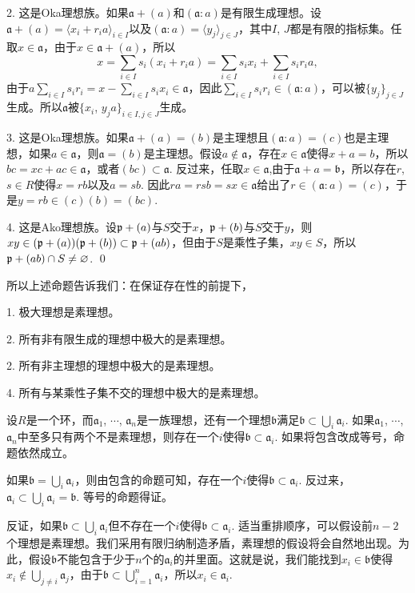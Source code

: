 	2. 这是Oka理想族。如果$\mathfrak{a}+(a)$和$(\mathfrak{a}:a)$是有限生成理想。设$\mathfrak{a}+(a)=\langle x_i+r_ia \rangle_{i\in I}$以及$(\mathfrak{a}:a)=\langle y_j\rangle_{j\in J}$，其中$I$, $J$都是有限的指标集。任取$x\in \mathfrak{a}$，由于$x\in \mathfrak{a}+(a)$，所以
	\[
		x= \sum_{i\in I}s_i(x_i+r_ia)=\sum_{i\in I}s_ix_i+\sum_{i\in I}s_ir_ia,
	\]
	由于$a\sum_{i\in I}s_ir_i=x-\sum_{i\in I}s_ix_i\in \mathfrak{a}$，因此$\sum_{i\in I}s_ir_i\in (\mathfrak{a}:a)$，可以被$\{y_j\}_{j\in J}$生成。所以$\mathfrak{a}$被$\{x_i$, $y_ja\}_{i\in I,j\in J}$生成。

	3. 这是Oka理想族。如果$\mathfrak{a}+(a)=(b)$是主理想且$(\mathfrak{a}:a)=(c)$也是主理想，如果$a\in \mathfrak{a}$，则$\mathfrak{a}=(b)$是主理想。假设$a\not\in\mathfrak{a}$，存在$x\in \mathfrak{a}$使得$x+a=b$，所以$bc=xc+ac\in \mathfrak{a}$，或者$(bc)\subset \mathfrak{a}$. 反过来，任取$x\in \mathfrak{a}$,由于$\mathfrak{a}+a=\mathfrak{b}$，所以存在$r$, $s\in R$使得$x=rb$以及$a=sb$. 因此$ra=rsb=sx\in\mathfrak{a}$给出了$r\in (\mathfrak{a}:a)=(c)$，于是$y=rb\in (c)(b)=(bc)$.

	4. 这是Ako理想族。设$\mathfrak{p}+(a)$与$S$交于$x$，$\mathfrak{p}+(b)$与$S$交于$y$，则$xy\in (\mathfrak{p}+(a))(\mathfrak{p}+(b))\subset \mathfrak{p}+(ab)$，但由于$S$是乘性子集，$xy\in S$，所以$\mathfrak{p}+(ab)\cap S\neq \varnothing$.
\qed

所以上述命题告诉我们：在保证存在性的前提下，

	1. 极大理想是素理想。

	2. 所有非有限生成的理想中极大的是素理想。

	2. 所有非主理想的理想中极大的是素理想。

	4. 所有与某乘性子集不交的理想中极大的是素理想。

\pro 设$R$是一个环，而$\mathfrak{a}_1$, $\cdots$, $\mathfrak{a}_n$是一族理想，还有一个理想$\mathfrak{b}$满足$\mathfrak{b}\subset \bigcup_i \mathfrak{a}_i$. 如果$\mathfrak{a}_1$, $\cdots$, $\mathfrak{a}_n$中至多只有两个不是素理想，则存在一个$i$使得$\mathfrak{b}\subset \mathfrak{a}_i$. 如果将包含改成等号，命题依然成立。

\proof
	如果$\mathfrak{b}=\bigcup_i \mathfrak{a}_i$，则由包含的命题可知，存在一个$i$使得$\mathfrak{b}\subset \mathfrak{a}_i$. 反过来，$\mathfrak{a}_i\subset \bigcup_i \mathfrak{a}_i=\mathfrak{b}$. 等号的命题得证。

	反证，如果$\mathfrak{b}\subset \bigcup_i \mathfrak{a}_i$但不存在一个$i$使得$\mathfrak{b}\subset \mathfrak{a}_i$. 适当重排顺序，可以假设前$n-2$个理想是素理想。我们采用有限归纳制造矛盾，素理想的假设将会自然地出现。为此，假设$\mathfrak{b}$不能包含于少于$n$个的$\mathfrak{a}_i$的并里面。这就是说，我们能找到$x_i\in \mathfrak{b}$使得$x_i\not\in \bigcup_{j\neq i}\mathfrak{a}_j$，由于$\mathfrak{b}\subset \bigcup_{i=1}^n \mathfrak{a}_i$，所以$x_i\in \mathfrak{a}_i$.

